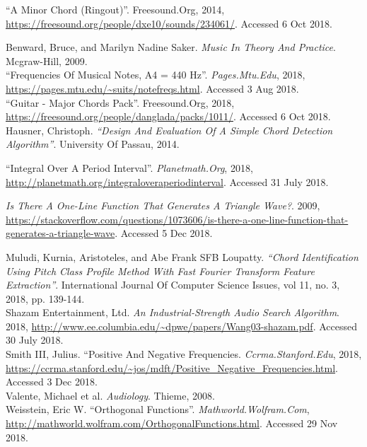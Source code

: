 \documentclass{article}
\begin{document}
\begin{hangparas}{.25in}{1}

\begin{sloppypar}
	``A Minor Chord (Ringout)''. Freesound.Org, 2014,
	\url{https://freesound.org/people/dxe10/sounds/234061/}. Accessed 6 Oct
	2018.\\	
\end{sloppypar}

Benward, Bruce, and Marilyn Nadine Saker. 
\textit{Music In Theory And Practice}. Mcgraw-Hill, 2009. \\

``Frequencies Of Musical Notes, A4 = 440 Hz''. \textit{Pages.Mtu.Edu}, 2018, 
\url{https://pages.mtu.edu/~suits/notefreqs.html}. Accessed 3 Aug 2018. \\

``Guitar - Major Chords Pack''. Freesound.Org, 2018, 
\url{https://freesound.org/people/danglada/packs/1011/}. Accessed 6 Oct 2018. \\

Hausner, Christoph. \textit{``Design And Evaluation Of A Simple Chord 
Detection Algorithm''}. University Of Passau, 2014. \\

\begin{sloppypar}
	``Integral Over A Period Interval''. \textit{Planetmath.Org}, 2018,
	\url{http://planetmath.org/integraloveraperiodinterval}. Accessed 31 July
	2018.  \\
\end{sloppypar}

\textit{Is There A One-Line Function That Generates A Triangle Wave?}. 2009,
\url{https://stackoverflow.com/questions/1073606/is-there-a-one-line-function-that-generates-a-triangle-wave}.
Accessed 5 Dec 2018.

Muludi, Kurnia, Aristoteles, and Abe Frank SFB Loupatty. \textit{``Chord 
Identification Using Pitch Class Profile Method With Fast Fourier Transform 
Feature Extraction''}. International Journal Of Computer Science Issues, vol 
11, no. 3, 2018, pp. 139-144. \\

Shazam Entertainment, Ltd. \textit{An Industrial-Strength Audio Search 
Algorithm}. 2018, 
\url{http://www.ee.columbia.edu/~dpwe/papers/Wang03-shazam.pdf}. 
Accessed 30 July 2018. \\

Smith III, Julius. ``Positive And Negative Frequencies.
\textit{Ccrma.Stanford.Edu}, 2018,
\url{https://ccrma.stanford.edu/~jos/mdft/Positive_Negative_Frequencies.html}.
Accessed 3 Dec 2018. \\

Valente, Michael et al. \textit{Audiology}. Thieme, 2008. \\

Weisstein, Eric W. ``Orthogonal Functions''. \textit{Mathworld.Wolfram.Com},
\url{http://mathworld.wolfram.com/OrthogonalFunctions.html}. Accessed 29 Nov 2018. \\

\end{hangparas}
\end{document}
